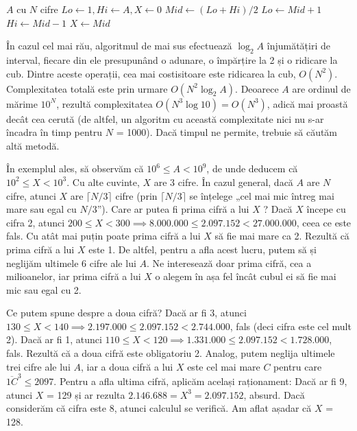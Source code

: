 \vspace{\algskip}
\begin{algorithmic}[1]
   $A$ cu $N$ cifre
  \STATE $Lo \leftarrow 1, Hi \leftarrow A, X \leftarrow 0$
  \STATE $Mid \leftarrow (Lo+Hi)/2$
  \STATE $Lo \leftarrow Mid+1$
  \STATE $Hi \leftarrow Mid-1$
  \ELSE
  \STATE $X \leftarrow Mid$
  \ENDIF
  \ENDWHILE
\end{algorithmic}

În cazul cel mai rău, algoritmul de mai sus efectuează $\log_2 A$ înjumătățiri
de interval, fiecare din ele presupunând o adunare, o împărțire la 2 și o
ridicare la cub. Dintre aceste operații, cea mai costisitoare este ridicarea
la cub, $O(N^2)$. Complexitatea totală este prin urmare $O(N^2 \log_2
A)$. Deoarece $A$ are ordinul de mărime $10^N$, rezultă complexitatea $O(N^3
\log 10)= O(N^3)$, adică mai proastă decât cea cerută (de altfel, un algoritm
cu această complexitate nici nu s-ar încadra în timp pentru $N$ = 1000). Dacă
timpul ne permite, trebuie să căutăm altă metodă.

În exemplul ales, să observăm că $10^6 \leq A < 10^9$, de unde deducem că
$10^2 \leq X < 10^3$. Cu alte cuvinte, $X$ are 3 cifre. În cazul general, dacă
$A$ are $N$ cifre, atunci $X$ are $\lceil N / 3 \rceil$ cifre (prin $\lceil N
/ 3 \rceil$ se înțelege „cel mai mic întreg mai mare sau egal cu $N /
3$”). Care ar putea fi prima cifră a lui $X$ ? Dacă $X$ începe cu cifra 2,
atunci $200 \leq X < 300 \implies 8.000.000 \leq 2.097.152 < 27.000.000$, ceea
ce este fals. Cu atât mai puțin poate prima cifră a lui $X$ să fie mai mare ca
2. Rezultă că prima cifră a lui $X$ este 1. De altfel, pentru a afla acest
lucru, putem să și neglijăm ultimele 6 cifre ale lui $A$. Ne interesează doar
prima cifră, cea a milioanelor, iar prima cifră a lui $X$ o alegem în așa fel
încât cubul ei să fie mai mic sau egal cu 2.

Ce putem spune despre a doua cifră? Dacă ar fi 3, atunci $130 \leq X < 140
\implies 2.197.000 \leq 2.097.152 < 2.744.000$, fals (deci cifra este cel mult
2). Dacă ar fi 1, atunci $110 \leq X < 120 \implies 1.331.000 \leq 2.097.152 <
1.728.000$, fals. Rezultă că a doua cifră este obligatoriu 2. Analog, putem
neglija ultimele trei cifre ale lui $A$, iar a doua cifră a lui $X$ este cel
mai mare $C$ pentru care $\overline{1C}^3 \leq 2097$. Pentru a afla ultima
cifră, aplicăm același raționament: Dacă ar fi 9, atunci $X$ = 129 și ar
rezulta $2.146.688 = X^3 = 2.097.152$, absurd. Dacă considerăm că cifra este
8, atunci calculul se verifică. Am aflat așadar că $X$ = 128.

